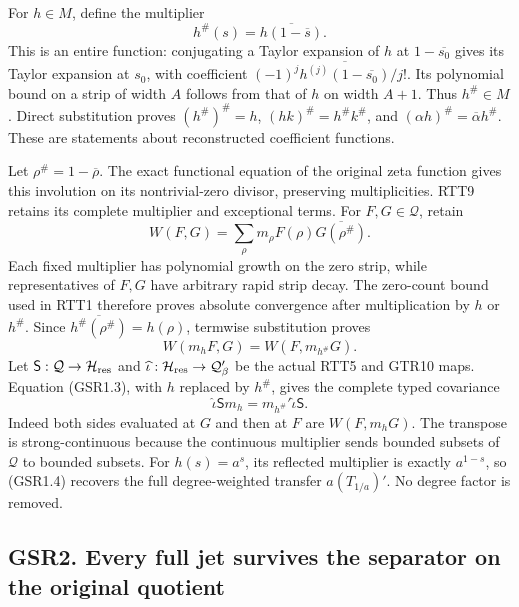 For \(h\in M\), define the multiplier \[
h^\#(s)=\overline{h(1-\overline s)}.
\tag{GSR1.1}
\] This is an entire function: conjugating a Taylor expansion of \(h\)
at \(1-\overline{s_0}\) gives its Taylor expansion at \(s_0\), with
coefficient \((-1)^j\overline{h^{(j)}(1-\overline{s_0})}/j!\). Its
polynomial bound on a strip of width \(A\) follows from that of \(h\) on
width \(A+1\). Thus \(h^\#\in M\). Direct substitution proves
\((h^\#)^\#=h\), \((hk)^\#=h^\#k^\#\), and
\((\alpha h)^\#=\overline\alpha h^\#\). These are statements about
reconstructed coefficient functions.

Let \(\rho^\#=1-\overline\rho\). The exact functional equation of the
original zeta function gives this involution on its nontrivial-zero
divisor, preserving multiplicities. RTT9 retains its complete multiplier
and exceptional terms. For \(F,G\in\mathcal Q\), retain \[
W(F,G)=\sum_{\rho}m_\rho F(\rho)\overline{G(\rho^\#)}.
\tag{GSR1.2}
\] Each fixed multiplier has polynomial growth on the zero strip, while
representatives of \(F,G\) have arbitrary rapid strip decay. The
zero-count bound used in RTT1 therefore proves absolute convergence
after multiplication by \(h\) or \(h^\#\). Since
\(\overline{h^\#(\rho^\#)}=h(\rho)\), termwise substitution proves \[
W(m_hF,G)=W(F,m_{h^\#}G).
\tag{GSR1.3}
\] Let \(\mathsf S:\mathcal Q\to\mathcal H_{\rm res}\) and
\(\widehat\iota:\mathcal H_{\rm res}\to\mathcal Q'_\beta\) be the actual
RTT5 and GTR10 maps. Equation (GSR1.3), with \(h\) replaced by \(h^\#\),
gives the complete typed covariance \[
\widehat\iota\mathsf S m_h
=m_{h^\#}'\widehat\iota\mathsf S.
\tag{GSR1.4}
\] Indeed both sides evaluated at \(G\) and then at \(F\) are
\(W(F,m_hG)\). The transpose is strong-continuous because the continuous
multiplier sends bounded subsets of \(\mathcal Q\) to bounded subsets.
For \(h(s)=a^s\), its reflected multiplier is exactly \(a^{1-s}\), so
(GSR1.4) recovers the full degree-weighted transfer \(a(T_{1/a})'\). No
degree factor is removed.

\subsection{GSR2. Every full jet survives the separator on the original
quotient}\label{gsr2.-every-full-jet-survives-the-separator-on-the-original-quotient}

